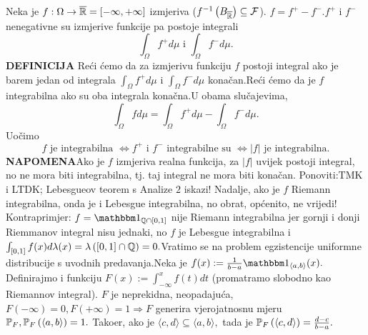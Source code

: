 \documentclass{article}
\begin{document}
Neka je \(f:\Omega\to\overline{\Bbb R}=[-\infty,+\infty]\) izmjeriva (\(f^{-1}\left(B_{\overline{\Bbb R}}\right)\subseteq\mathcal F\)). \(f=f^+-f^-.\)\newline \(f^+\) i \(f^-\) nenegativne su izmjerive funkcije pa postoje integrali \[\int_\Omega f^+d\mu\text{ i }\int_\Omega f^-d\mu.\] 
\textbf{DEFINICIJA}\newline
Reći ćemo da za izmjerivu funkciju \(f\) postoji integral ako je barem jedan od integrala \(\int_\Omega f^+d\mu\) i \(\int_\Omega f^-d\mu\) konačan.\newline Reći ćemo da je \(f\) integrabilna ako su oba integrala konačna.\newline U obama slučajevima, \[\int_\Omega fd\mu=\int_\Omega f^+d\mu-\int_\Omega f^-d\mu.\] 
Uočimo \[f\text{ je integrabilna }\Leftrightarrow f^+\text{ i }f^-\text{ integrabilne su }\Leftrightarrow |f|\text{ je integrabilna}.\] 
\textbf{NAPOMENA}\newline Ako je \(f\) izmjeriva realna funkcija, za \(|f|\) uvijek postoji integral, no ne mora biti integrabilna, tj. taj integral ne mora biti konačan.\newline\newline
Ponoviti:\newline TMK i LTDK; Lebesgueov teorem s Analize \(2\) iskazi!\newline\newline
Nadalje, ako je \(f\) Riemann integrabilna, onda je i Lebesgue integrabilna, no obrat, općenito, ne vrijedi! Kontraprimjer: \(f=\mathbbm 1_{\Bbb Q\cap[0,1]}\) nije Riemann integrabilna jer gornji i donji Riemmanov integral nisu jednaki, no \(f\) je Lebesgue integrabilna i \(\int_{[0,1]}f(x)d\lambda(x)=\lambda\left([0,1]\cap\Bbb Q\right)=0.\)\newline\newline Vratimo se na problem egzistencije uniformne distribucije s uvodnih predavanja.\newline\newline Neka je \(f(x):=\frac1{b-a}\mathbbm 1_{\langle a,b\rangle}(x).\)  Definirajmo i funkciju \(F(x):=\int_{-\infty}^x f(t)dt\) (promatramo slobodno kao Riemannov integral). \(F\) je neprekidna, neopadajuća, \(F(-\infty)=0,F(+\infty)=1\Rightarrow F\) generira vjerojatnosnu mjeru \(\Bbb P_F,\Bbb P_F\left(\langle a,b\rangle\right)=1.\) Tako\dj{}er, ako je \(\langle c,d\rangle\subseteq\langle a,b\rangle,\) tada je \(\Bbb P_F\left(\langle c,d\rangle\right)=\frac{d-c}{b-a}.\)\newline\newline
\end{document}

